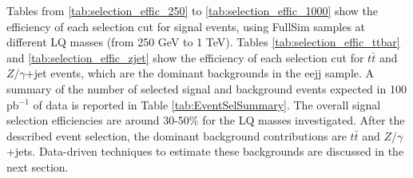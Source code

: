 Tables from \ref{tab:selection_effic_250} to \ref{tab:selection_effic_1000} show the efficiency 
of each selection cut for signal events, using FullSim samples at different LQ masses (from 250 GeV to 1 TeV).
Tables \ref{tab:selection_effic_ttbar} and \ref{tab:selection_effic_zjet} show the efficiency of each selection cut 
for $t\bar{t}$ and $Z/\gamma$+jet events, which are the dominant backgrounds in the eejj sample. 
A summary of the number of selected signal and background events expected in 100 pb$^{-1}$ of data 
is reported in Table \ref{tab:EventSelSummary}. 
The overall signal selection efficiencies are around 30-50\% for the LQ masses investigated. 
After the described event selection, the dominant background contributions 
are $t\bar{t}$ and $Z/\gamma$+jets. Data-driven techniques to estimate these backgrounds
are discussed in the next section.

